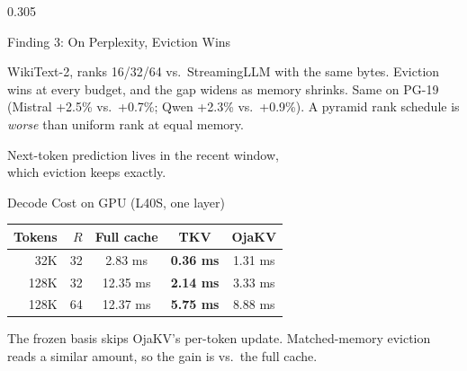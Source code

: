 \documentclass[final]{beamer}
\newcommand{\takeaway}[1]{%
  \begin{center}
  \colorbox{soft}{\parbox{0.96\linewidth}{\vspace{0.35cm}\centering\large #1\vspace{0.35cm}}}
  \end{center}}
\begin{document}
\begin{frame}[t]
\begin{columns}[t]
\begin{column}{0.305\paperwidth}
\begin{block}{Finding 3: On Perplexity, Eviction Wins}
\begin{center}
%
\end{center}
WikiText-2, ranks 16/32/64 vs.\ StreamingLLM with the same bytes. Eviction
wins at every budget, and the gap widens as memory shrinks. Same on PG-19
(Mistral +2.5\% vs.\ +0.7\%; Qwen +2.3\% vs.\ +0.9\%). A pyramid rank schedule
is \emph{worse} than uniform rank at equal memory.
\takeaway{Next-token prediction lives in the recent window,\\ which eviction keeps exactly.}
\end{block}

\begin{block}{Decode Cost on GPU (L40S, one layer)}
\begin{center}
\begin{tabular}{rrccc}
\toprule
Tokens & $R$ & Full cache & TKV & OjaKV \\
\midrule
32K & 32 & 2.83 ms & \textbf{0.36 ms} & 1.31 ms \\
128K & 32 & 12.35 ms & \textbf{2.14 ms} & 3.33 ms \\
128K & 64 & 12.37 ms & \textbf{5.75 ms} & 8.88 ms \\
\bottomrule
\end{tabular}
\end{center}
\vspace{0.1cm}
The frozen basis skips OjaKV's per-token update. Matched-memory eviction reads
a similar amount, so the gain is vs.\ the full cache.
\end{block}


\end{column}
\end{columns}
\end{frame}
\end{document}

